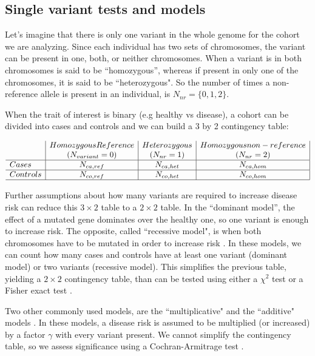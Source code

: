 \subsection{Single variant tests and models \label{sec:single}}

Let's imagine that there is only one variant in the whole genome for the cohort we are analyzing. Since each individual has two sets of chromosomes, the variant can be present in one, both, or neither chromosomes. When a variant is in both chromosomes is said to be ``homozygous'', whereas if present in only one of the chromosomes, it is said to be ``heterozygous". So the number of times a non-reference allele is present in an individual, is $ N_{nr} = \{0, 1,2\}$.

When the trait of interest is binary (e.g healthy vs disease), a cohort can be divided into cases and controls and we can build a 3 by 2 contingency table:

\[
\begin{array}{l|c|c|c|}
	& Homozygous Reference & Heterozygous & Homozygous non-reference\\
	& (N_{variant} = 0) & (N_{nr} = 1) & (N_{nr} = 2) \\
    \hline 
    Cases & N_{ca,ref} & N_{ca,het} & N_{ca,hom} \\ 
    \hline 
    Controls & N_{co,ref} & N_{co,het} & N_{co,hom} \\
    \hline 
\end{array} 
\]

Further assumptions about how many variants are required to increase disease risk can reduce this $3 \times 2$ table to a $2 \times 2$ table. In the ``dominant model'', the effect of a mutated gene dominates over the healthy one, so one variant is enough to increase risk. The opposite, called ``recessive model", is when both chromosomes have to be mutated in order to increase risk \cite{balding2006tutorial, clarke2011basic}. In these models, we can count how many cases and controls have at least one variant (dominant model) or two variants (recessive model). This simplifies the previous table, yielding a $2 \times 2$ contingency table, than can be tested using either a $\chi^2$ test or a Fisher exact test \cite{balding2006tutorial}.

Two other commonly used models, are the ``multiplicative" and the ``additive" models \cite{balding2006tutorial,clarke2011basic}. In these models, a disease risk is assumed to be multiplied (or increased) by a factor $\gamma$ with every variant present. We cannot simplify the contingency table, so we assess significance using a Cochran-Armitrage test \cite{clarke2011basic}.

